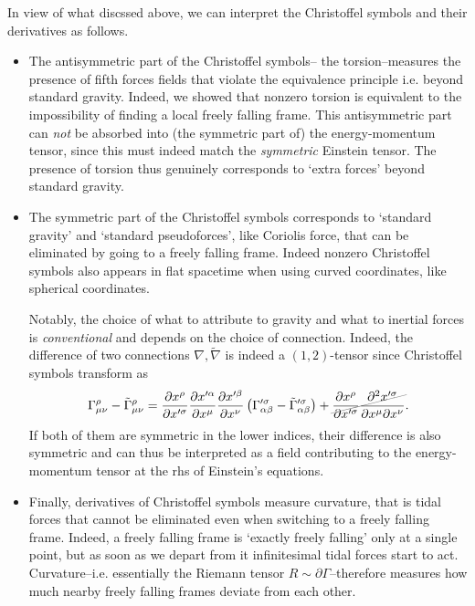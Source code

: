\documentclass[../geometry_main.tex]{subfiles}
\begin{document}
\begin{mytheorem}
In view of what discssed above, we can interpret the Christoffel symbols and their derivatives as follows.
\begin{itemize}
    \item The antisymmetric part of the Christoffel symbols-- the torsion--measures the presence of fifth forces fields that violate the equivalence principle i.e. beyond standard gravity.
    Indeed, we showed that nonzero torsion is equivalent to the impossibility of finding a local freely falling frame.
    This antisymmetric part can \emph{not} be absorbed into (the symmetric part of) the energy-momentum tensor, since this must indeed match the \emph{symmetric} Einstein tensor.
    The presence of torsion thus genuinely corresponds to `extra forces' beyond standard gravity.
    \item The symmetric part of the Christoffel symbols corresponds to `standard gravity' and `standard pseudoforces', like Coriolis force, that can be eliminated by going to a freely falling frame.
    Indeed nonzero Christoffel symbols also appears in flat spacetime when using curved coordinates, like spherical coordinates.

    Notably, the choice of what to attribute to gravity and what to inertial forces is \emph{conventional} and depends on the choice of connection.
    Indeed, the difference of two connections $\nabla,\tilde{\nabla}$ is indeed a $(1,2)$-tensor since Christoffel symbols transform as
    \begin{align}\label{eq:difference_connection_is_tensor}
        \Gamma^{\rho}_{\mu \nu}- \tilde{\Gamma}^{\rho}_{\mu \nu} = \frac{\partial x^{\rho}}{\partial x^{\prime \sigma}} \frac{\partial x^{\prime \alpha}}{\partial x^{\mu}} \frac{\partial x^{\prime \beta}}{\partial x^{\nu}} \left(\Gamma^{\prime \sigma}_{\alpha \beta}-\tilde{\Gamma}^{\prime \sigma}_{\alpha \beta}\right) + \graycancel{ \frac{\partial x^{\rho}}{\partial x^{\prime \sigma}} \frac{\partial^2 x^{\prime \sigma}}{\partial x^{\mu} \partial x^{\nu}}}.
    \end{align}
    If both of them are symmetric in the lower indices, their difference is also symmetric and can thus be interpreted as a field contributing to the energy-momentum tensor at the rhs of Einstein's equations.
    \item Finally, derivatives of Christoffel symbols measure curvature, that is tidal forces that cannot be eliminated even when switching to a freely falling frame.
    Indeed, a freely falling frame is `exactly freely falling' only at a single point, but as soon as we depart from it infinitesimal tidal forces start to act.
    Curvature--i.e. essentially the Riemann tensor $R\sim \partial \Gamma$--therefore measures how much nearby freely falling frames deviate from each other.
\end{itemize}
\end{mytheorem}
\end{document}
